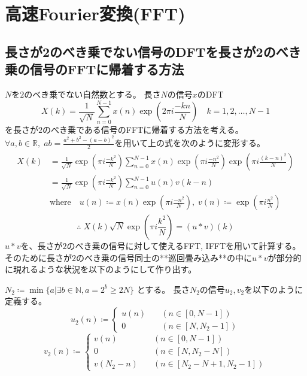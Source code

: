 \chapter{高速Fourier変換(FFT)}
    \section{長さが2のべき乗でない信号のDFTを長さが2のべき乗の信号のFFTに帰着する方法}
        $N$を$2$のべき乗でない自然数とする。
        長さ$N$の信号$x$のDFT
        \[ X(k) = \frac{1}{\sqrt{N}} \sum_{n=0}^{N-1} x(n)\exp \left(2\pi i\frac{-kn}{N}\right) \quad k=1,2,\dots,N-1 \]
        を長さが$2$のべき乗である信号のFFTに帰着する方法を考える。
        $\forall a,b\in\mathbb{R},\;ab = \frac{a^2 + b^2 - (a-b)^2}{2}$を用いて上の式を次のように変形する。
        \begin{align*}
            \begin{aligned}
                X(k) &= \frac{1}{\sqrt{N}} \exp \left(\pi i\frac{-k^2}{N}\right) \sum_{n=0}^{N-1} x(n)\exp \left(\pi i\frac{-n^2}{N}\right) \exp \left(\pi i\frac{(k-n)^2}{N}\right) \\
                &= \frac{1}{\sqrt{N}} \exp \left(\pi i\frac{-k^2}{N}\right) \sum_{n=0}^{N-1} u(n)v(k-n) \\
                & \text{where} \quad u(n) \coloneqq x(n)\exp \left(\pi i\frac{-n^2}{N}\right),\;v(n) \coloneqq \exp \left(\pi i\frac{n^2}{N}\right)
            \end{aligned}
        \end{align*}
        \[ \therefore\; X(k)\sqrt{N} \exp \left(\pi i\frac{k^2}{N}\right) = (u*v)(k) \]
        $u*v$を、長さが$2$のべき乗の信号に対して使えるFFT, IFFTを用いて計算する。
        そのために長さが$2$のべき乗の信号同士の**巡回畳み込み**の中に$u*v$が部分的に現れるような状況を以下のようにして作り出す。
        \par
        $N_2 \coloneqq \min\{a|\exists b\in \mathbb{N}, a = 2^b \geq 2N\}$ とする。
        長さ$N_2$の信号$u_2,v_2$を以下のように定義する。
        \[
            u_2(n) \coloneqq \left\{
                \begin{aligned}
                    u(n) &\quad (n \in [0,N-1]) \\
                    0 &\quad (n \in [N,N_2-1])
                \end{aligned}
            \right.
        \]
        \[
            v_2(n) \coloneqq \left\{
                \begin{aligned}
                    v(n) &\quad (n \in [0,N-1]) \\
                    0 &\quad (n\in [N,N_2-N]) \\
                    v(N_2-n) &\quad (n \in [N_2-N+1,N_2-1])
                \end{aligned}
            \right.
        \]
